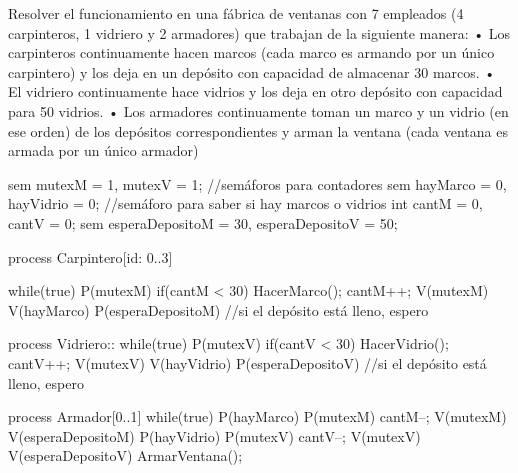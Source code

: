 Resolver el funcionamiento en una fábrica de ventanas con 7 empleados (4 carpinteros, 1
vidriero y 2 armadores) que trabajan de la siguiente manera:
    • Los carpinteros continuamente hacen marcos (cada marco es armando por un único
    carpintero) y los deja en un depósito con capacidad de almacenar 30 marcos.
    • El vidriero continuamente hace vidrios y los deja en otro depósito con capacidad para
    50 vidrios.
    • Los armadores continuamente toman un marco y un vidrio (en ese orden) de los
    depósitos correspondientes y arman la ventana (cada ventana es armada por un único
    armador)


sem mutexM = 1, mutexV = 1; //semáforos para contadores
sem hayMarco = 0, hayVidrio = 0; //semáforo para saber si hay marcos o vidrios
int cantM = 0, cantV = 0;
sem esperaDepositoM = 30, esperaDepositoV = 50;

process Carpintero[id: 0..3]
{
    while(true)    
    {
        P(mutexM)
        if(cantM < 30)
        {
            HacerMarco();
            cantM++;
        }
        V(mutexM)
        V(hayMarco)
        P(esperaDepositoM) //si el depósito está lleno, espero
    }
    
}

process Vidriero::
{
    while(true)
    {
        P(mutexV)
        if(cantV < 30)
        {
            HacerVidrio();
            cantV++;
        }
        V(mutexV)
        V(hayVidrio)
        P(esperaDepositoV) //si el depósito está lleno, espero
    }
}

process Armador[0..1]
{
    while(true)
    {
        P(hayMarco)
        P(mutexM)
        cantM--;
        V(mutexM)
        V(esperaDepositoM)
        P(hayVidrio)
        P(mutexV)
        cantV--;
        V(mutexV)
        V(esperaDepositoV)
        ArmarVentana();
    }
}